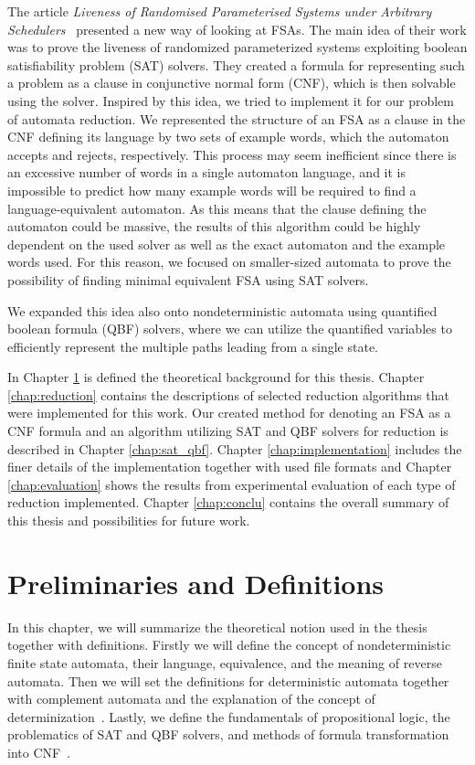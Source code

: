 The article \textit{Liveness of Randomised Parameterised Systems under Arbitrary Schedulers}~\cite{Lin2016} presented a new way of looking at FSAs. The main idea of their work was to prove the liveness of randomized parameterized systems exploiting boolean satisfiability problem (SAT) solvers. They created a formula for representing such a problem as a clause in conjunctive normal form (CNF), which is then solvable using the solver. Inspired by this idea, we tried to implement it for our problem of automata reduction. We represented the structure of an FSA as a clause in the CNF defining its language by two sets of example words, which the automaton accepts and rejects, respectively. This process may seem inefficient since there is an excessive number of words in a single automaton language, and it is impossible to predict how many example words will be required to find a language-equivalent automaton. As this means that the clause defining the automaton could be massive, the results of this algorithm could be highly dependent on the used solver as well as the exact automaton and the example words used. For this reason, we focused on smaller-sized automata to prove the possibility of finding minimal equivalent FSA using SAT solvers.

We expanded this idea also onto nondeterministic automata using quantified boolean formula (QBF) solvers, where we can utilize the quantified variables to efficiently represent the multiple paths leading from a single state.

In Chapter \ref{chap:theory} is defined the theoretical background for this thesis. Chapter \ref{chap:reduction} contains the descriptions of selected reduction algorithms that were implemented for this work. Our created method for denoting an FSA as a CNF formula and an algorithm utilizing SAT and QBF solvers for reduction is described in Chapter \ref{chap:sat_qbf}. Chapter \ref{chap:implementation} includes the finer details of the implementation together with used file formats and Chapter \ref{chap:evaluation} shows the results from experimental evaluation of each type of reduction implemented. Chapter \ref{chap:conclu} contains the overall summary of this thesis and possibilities for future work.


\chapter{Preliminaries and Definitions}
\label{chap:theory}

In this chapter, we will summarize the theoretical notion used in the thesis together with definitions. Firstly we will define the concept of nondeterministic finite state automata, their language, equivalence, and the meaning of reverse automata. Then we will set the definitions for deterministic automata together with complement automata and the explanation of the concept of determinization~\cite{Maheshwari2019, Sipser2006}. Lastly, we define the fundamentals of propositional logic, the problematics of SAT and QBF solvers, and methods of formula transformation into CNF~\cite{Abdulla2010, GaneshV20, Keef2023, Masina2023, Prince2020, Sipser2006, SAV}.

